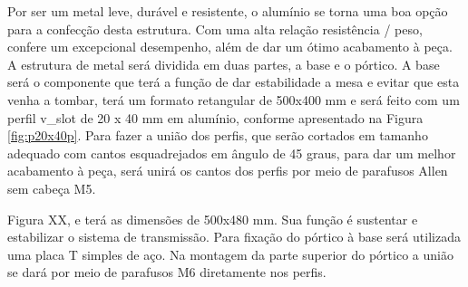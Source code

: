 Por ser um metal leve, durável e resistente, o alumínio se torna uma boa opção para a confecção desta 
estrutura. Com uma alta relação resistência / peso, confere um excepcional desempenho, além de dar um ótimo 
acabamento à peça. A estrutura de metal será dividida em duas partes, a base e o pórtico. A base será 
o componente que terá a função de dar estabilidade a mesa e evitar que esta venha  a tombar, terá um 
formato retangular de 500x400 mm e será feito com um perfil v\_slot de 20 x 40 mm em alumínio, conforme 
apresentado na Figura \ref{fig:p20x40p}. 
Para fazer a união dos perfis, que serão cortados em tamanho 
adequado com cantos esquadrejados em ângulo de 45 graus, para dar um melhor acabamento à peça, será 
unirá os cantos dos perfis por meio de parafusos Allen sem cabeça M5.

    
    
    
    
    
    
Figura XX, e terá as dimensões de 500x480 mm. Sua função é sustentar e estabilizar o sistema 
de transmissão. Para fixação do pórtico à base será utilizada uma placa T simples de aço. 
Na montagem da parte superior do pórtico a união se dará por meio de parafusos M6 diretamente nos perfis.

